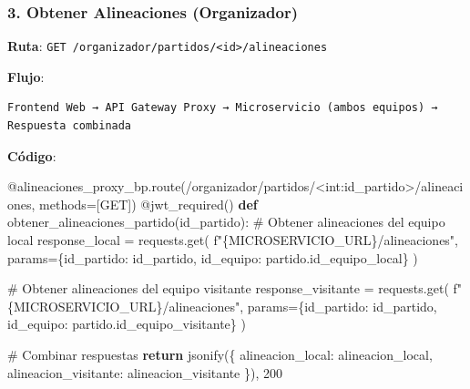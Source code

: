 \documentclass[
  spanish,
  11pt,
  letterpaper,
]{book}
\newenvironment{Shaded}{\begin{snugshade}}{\end{snugshade}}
\newcommand{\AttributeTok}[1]{\textcolor[rgb]{0.40,0.45,0.13}{#1}}
\newcommand{\CommentTok}[1]{\textcolor[rgb]{0.37,0.37,0.37}{#1}}
\newcommand{\ControlFlowTok}[1]{\textcolor[rgb]{0.00,0.23,0.31}{\textbf{#1}}}
\newcommand{\DecValTok}[1]{\textcolor[rgb]{0.68,0.00,0.00}{#1}}
\newcommand{\KeywordTok}[1]{\textcolor[rgb]{0.00,0.23,0.31}{\textbf{#1}}}
\newcommand{\NormalTok}[1]{\textcolor[rgb]{0.00,0.23,0.31}{#1}}
\newcommand{\OperatorTok}[1]{\textcolor[rgb]{0.37,0.37,0.37}{#1}}
\newcommand{\SpecialCharTok}[1]{\textcolor[rgb]{0.37,0.37,0.37}{#1}}
\newcommand{\SpecialStringTok}[1]{\textcolor[rgb]{0.13,0.47,0.30}{#1}}
\newcommand{\StringTok}[1]{\textcolor[rgb]{0.13,0.47,0.30}{#1}}
\begin{document}
\subsubsection{3. Obtener Alineaciones
(Organizador)}\label{obtener-alineaciones-organizador}

\textbf{Ruta}:
\texttt{GET\ /organizador/partidos/\textless{}id\textgreater{}/alineaciones}

\textbf{Flujo}:

\begin{verbatim}
Frontend Web → API Gateway Proxy → Microservicio (ambos equipos) → Respuesta combinada
\end{verbatim}

\textbf{Código}:

\begin{Shaded}
\begin{Highlighting}[]
\AttributeTok{@alineaciones\_proxy\_bp.route}\NormalTok{(}\StringTok{\textquotesingle{}/organizador/partidos/\textless{}int:id\_partido\textgreater{}/alineaciones\textquotesingle{}}\NormalTok{, methods}\OperatorTok{=}\NormalTok{[}\StringTok{\textquotesingle{}GET\textquotesingle{}}\NormalTok{])}
\AttributeTok{@jwt\_required}\NormalTok{()}
\KeywordTok{def}\NormalTok{ obtener\_alineaciones\_partido(id\_partido):}
    \CommentTok{\# Obtener alineaciones del equipo local}
\NormalTok{    response\_local }\OperatorTok{=}\NormalTok{ requests.get(}
        \SpecialStringTok{f"}\SpecialCharTok{\{}\NormalTok{MICROSERVICIO\_URL}\SpecialCharTok{\}}\SpecialStringTok{/alineaciones"}\NormalTok{,}
\NormalTok{        params}\OperatorTok{=}\NormalTok{\{}\StringTok{\textquotesingle{}id\_partido\textquotesingle{}}\NormalTok{: id\_partido, }\StringTok{\textquotesingle{}id\_equipo\textquotesingle{}}\NormalTok{: partido.id\_equipo\_local\}}
\NormalTok{    )}
    
    \CommentTok{\# Obtener alineaciones del equipo visitante}
\NormalTok{    response\_visitante }\OperatorTok{=}\NormalTok{ requests.get(}
        \SpecialStringTok{f"}\SpecialCharTok{\{}\NormalTok{MICROSERVICIO\_URL}\SpecialCharTok{\}}\SpecialStringTok{/alineaciones"}\NormalTok{,}
\NormalTok{        params}\OperatorTok{=}\NormalTok{\{}\StringTok{\textquotesingle{}id\_partido\textquotesingle{}}\NormalTok{: id\_partido, }\StringTok{\textquotesingle{}id\_equipo\textquotesingle{}}\NormalTok{: partido.id\_equipo\_visitante\}}
\NormalTok{    )}
    
    \CommentTok{\# Combinar respuestas}
    \ControlFlowTok{return}\NormalTok{ jsonify(\{}
        \StringTok{\textquotesingle{}alineacion\_local\textquotesingle{}}\NormalTok{: alineacion\_local,}
        \StringTok{\textquotesingle{}alineacion\_visitante\textquotesingle{}}\NormalTok{: alineacion\_visitante}
\NormalTok{    \}), }\DecValTok{200}
\end{Highlighting}
\end{Shaded}
\end{document}
